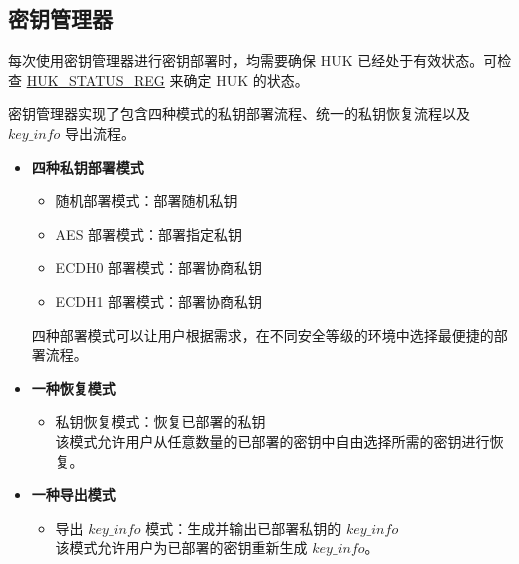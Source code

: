 \documentclass[main\_\_CN.tex]{subfiles}
\begin{document}
\subsection{密钥管理器}
\label{sec:key-manager}
\begin{tiplisting}
每次使用密钥管理器进行密钥部署时，均需要确保 HUK 已经处于有效状态。可检查 \hyperref[regdesc:HUKSTATUSREG]{HUK\_STATUS\_REG} 来确定 HUK 的状态。
\end{tiplisting}
密钥管理器实现了包含四种模式的私钥部署流程、统一的私钥恢复流程以及 \hyperref[para:keyinfo]{\begin{math}key\_info\end{math}} 导出流程。
\begin{itemize}
    \item \textbf{四种私钥部署模式}
    \begin{itemize}
        \item 随机部署模式：部署随机私钥
        \item AES 部署模式：部署指定私钥
        \item ECDH0 部署模式：部署协商私钥
        \item ECDH1 部署模式：部署协商私钥\\
    \end{itemize}
    四种部署模式可以让用户根据需求，在不同安全等级的环境中选择最便捷的部署流程。
    \item \textbf{一种恢复模式}
    \begin{itemize}
        \item 私钥恢复模式：恢复已部署的私钥\\
        该模式允许用户从任意数量的已部署的密钥中自由选择所需的密钥进行恢复。
    \end{itemize}
    \item \textbf{一种导出模式}
    \begin{itemize}
        \item 导出 \hyperref[para:keyinfo]{\begin{math}key\_info\end{math}} 模式：生成并输出已部署私钥的 \hyperref[para:keyinfo]{\begin{math}key\_info\end{math}}\\
        该模式允许用户为已部署的密钥重新生成 \hyperref[para:keyinfo]{\begin{math}key\_info\end{math}}。
    \end{itemize}
\end{itemize}
\end{document}
